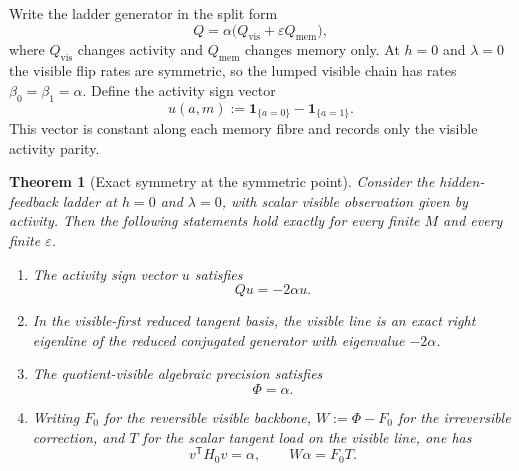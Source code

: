 \documentclass[11pt]{article}
\numberwithin{equation}{section}
\newcommand{\eps}{\varepsilon}
\theoremstyle{thmcompact}
\newtheorem{theorem}{Theorem}[section]
\theoremstyle{remark}
\begin{document}
Write the ladder generator in the split form
\begin{equation}\label{eq:ladder-generator-split}
Q = \alpha\bigl(Q_{\mathrm{vis}} + \eps Q_{\mathrm{mem}}\bigr),
\end{equation}
where $Q_{\mathrm{vis}}$ changes activity and $Q_{\mathrm{mem}}$ changes memory only. At $h=0$ and $\lambda=0$ the visible flip rates are symmetric, so the lumped visible chain has rates $\beta_0=\beta_1=\alpha$. Define the activity sign vector
\begin{equation}\label{eq:activity-sign-vector}
u(a,m) := \mathbf 1_{\{a=0\}} - \mathbf 1_{\{a=1\}}.
\end{equation}
This vector is constant along each memory fibre and records only the visible activity parity.

\begin{theorem}[Exact symmetry at the symmetric point]\label{thm:exact-symmetry-point}
Consider the hidden-feedback ladder at $h=0$ and $\lambda=0$, with scalar visible observation given by activity. Then the following statements hold exactly for every finite $M$ and every finite $\eps$.
\begin{enumerate}[label=(\roman*)]
\item The activity sign vector $u$ satisfies
\begin{equation}\label{eq:Qu-eigenmode}
Q u = -2\alpha u.
\end{equation}
\item In the visible-first reduced tangent basis, the visible line is an exact right eigenline of the reduced conjugated generator with eigenvalue $-2\alpha$.
\item The quotient-visible algebraic precision satisfies
\begin{equation}\label{eq:phi-equals-alpha}
\Phi = \alpha.
\end{equation}
\item Writing $F_0$ for the reversible visible backbone, $W:=\Phi-F_0$ for the irreversible correction, and $T$ for the scalar tangent load on the visible line, one has
\begin{equation}\label{eq:exact-symmetry-scalars}
v^{\mathsf T} H_0 v = \alpha,
\qquad
W\alpha = F_0 T.
\end{equation}
\end{enumerate}
\end{theorem}
\end{document}

